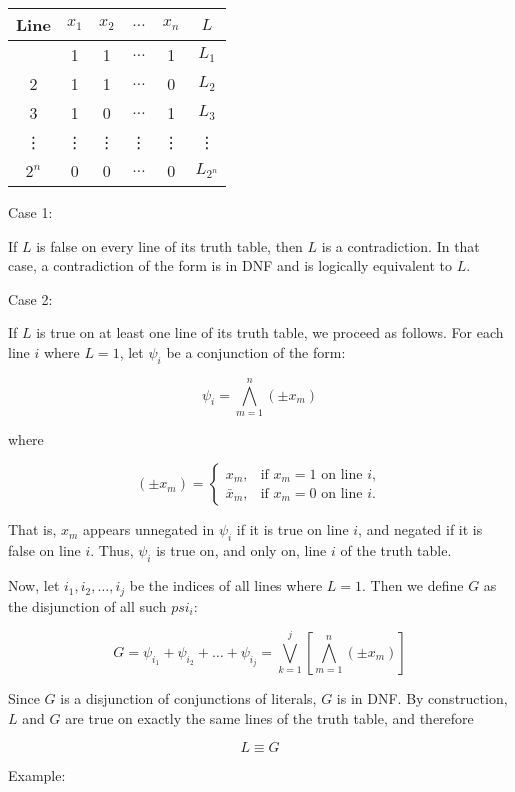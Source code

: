 \begin{longtable}[]{@{}cccccc@{}}
\toprule\noalign{}
Line & \(x_1\) & \(x_2\) & \(\dots\) & \(x_n\) & \(L\) \\
\midrule\noalign{}
\endhead
\bottomrule\noalign{}
\endlastfoot
1 & 1 & 1 & \(\dots\) & 1 & \(L_1\) \\
2 & 1 & 1 & \(\dots\) & 0 & \(L_2\) \\
3 & 1 & 0 & \(\dots\) & 1 & \(L_3\) \\
⋮ & ⋮ & ⋮ & ⋮ & ⋮ & ⋮ \\
\(2^n\) & 0 & 0 & \(\dots\) & 0 & \(L_{2^n}\) \\
\end{longtable}

Case 1:

If \(L\) is false on every line of its truth table, then \(L\) is a
contradiction. In that case, a contradiction of the form is in DNF and
is logically equivalent to \(L\).

Case 2:

If \(L\) is true on at least one line of its truth table, we proceed as
follows. For each line \(i\) where \(L = 1\), let \(\psi_i\) be a
conjunction of the form:

\[\psi_i = \displaystyle\bigwedge_{m=1}^{n} (\pm x_m)\]

where

\[
(\pm x_m) =
\begin{cases}
x_m, & \text{if } x_m = 1 \text{ on line } i, \\
\bar x_m, & \text{if } x_m = 0 \text{ on line } i.
\end{cases}
\]

That is, \(x_m\) appears unnegated in \(\psi_i\) if it is true on line
\(i\), and negated if it is false on line \(i\). Thus, \(\psi_i\) is
true on, and only on, line \(i\) of the truth table.

Now, let \(i_1, i_2, \dots, i_j\) be the indices of all lines where
\(L = 1\). Then we define \(G\) as the disjunction of all such
\(psi_i\):

\[G = \psi_{i_1} + \psi_{i_2} + \dots + \psi_{i_j} = \displaystyle\bigvee_{k=1}^{j} \left[ \bigwedge_{m=1}^{n} (\pm x_m) \right]\]

Since \(G\) is a disjunction of conjunctions of literals, \(G\) is in
DNF. By construction, \(L\) and \(G\) are true on exactly the same lines
of the truth table, and therefore

\[L \equiv G\]

Example:

